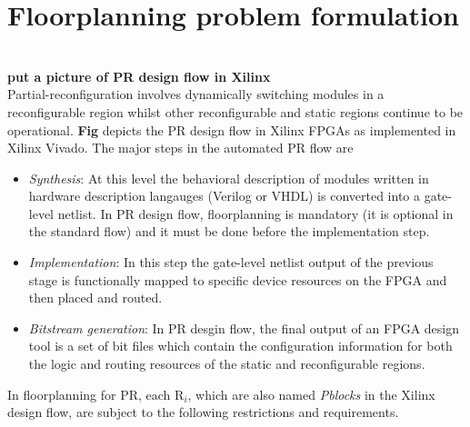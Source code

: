 \section{Floorplanning problem formulation}

\textbf{\\ put a picture of PR design flow in Xilinx} \\

Partial-reconfiguration involves dynamically switching modules in a reconfigurable region whilst other reconfigurable and static regions continue to be operational. \textbf{Fig} depicts the PR design flow in Xilinx FPGAs as implemented in Xilinx Vivado. The major steps in the automated PR flow are \\

\begin{itemize}
\item \textit{Synthesis}: At this level the behavioral description of modules written in hardware description langauges (Verilog or VHDL) is converted into a gate-level netlist. In PR design flow, floorplanning is mandatory (it is optional in the standard flow) and it must be done before the implementation step.  
\item \textit{Implementation}: In this step the gate-level netlist output of the previous stage is functionally mapped to specific device resources on the FPGA and then placed and routed.
\item \textit{Bitstream generation}: In PR desgin flow, the final output of an FPGA design tool is a set of bit files which contain the configuration information for both the logic and routing resources of the static and reconfigurable regions. 
\end{itemize} 

\hfill \break

In floorplanning for PR, each R$_i$, which are also named \textit{Pblocks} in the Xilinx design flow, are subject to the following restrictions and requirements. 

